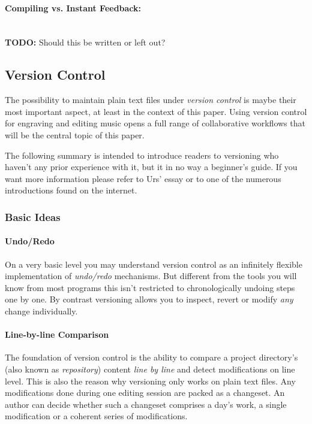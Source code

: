 \documentclass[11pt,a4paper]{article}
\begin{document}
\paragraph{Compiling vs. Instant Feedback:}
~\\\textbf{TODO:} Should this be written or left out?

\subsection{Version Control}
The possibility to maintain plain text files under \emph{version control} is maybe
their most important aspect, at least in the context of this paper. Using version
control for engraving and editing music opens a full range of collaborative workflows
that will be the central topic of this paper.

The following summary is intended to introduce readers to versioning who haven't any
prior experience with it, but it in no way a beginner's guide. If you want more
information please refer to Urs' essay or to one of the numerous introductions found
on the internet.

\subsubsection{Basic Ideas}

\paragraph{Undo/Redo}
On a very basic level you may understand version control as an infinitely flexible
implementation of \emph{undo/redo} mechanisms. But different from the tools you will
know from most programs this isn't restricted to chronologically undoing steps one by
one. By contrast versioning allows you to inspect, revert or modify \emph{any} change
individually.

\paragraph{Line-by-line Comparison}
The foundation of version control is the ability to compare a project directory's (also
known as \emph{repository}) content \emph{line by line} and detect modifications on line
level. This is also the reason why versioning only works on plain text files.
Any modifications done during one editing session are packed as a changeset. An author
can decide whether such a changeset comprises a day's work, a single modification or
a coherent series of modifications.
\end{document}
